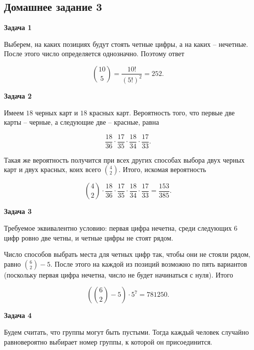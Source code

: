 \subsection{Домашнее задание 3}


	\begin{center}
    \textbf{Задача 1}
\end{center}
		Выберем, на каких позициях будут стоять четные цифры, а на каких -- нечетные. После этого число определяется однозначно. Поэтому ответ

		\begin{equation*}
			\binom{10}{5} = \frac{10!}{(5!)^2} = 252.
		\end{equation*}


	\begin{center}
    \textbf{Задача 2}
\end{center}
		Имеем $18$ черных карт и $18$ красных карт. Вероятность того, что первые две карты -- черные, а следующие две -- красные, равна

		\begin{equation*}
			\frac{18}{36} \cdot \frac{17}{35} \cdot \frac{18}{34} \cdot \frac{17}{33}.
		\end{equation*}

		Такая же вероятность получится при всех других способах выбора двух черных карт и двух красных, коих всего $\binom{4}{2}$. Итого, искомая вероятность

		\begin{equation*}
			\binom{4}{2} \cdot \frac{18}{36} \cdot \frac{17}{35} \cdot \frac{18}{34} \cdot \frac{17}{33} = \frac{153}{385}.
		\end{equation*}


	\begin{center}
    \textbf{Задача 3}
\end{center}
		Требуемое эквивалентно условию: первая цифра нечетна, среди следующих 6 цифр ровно две четны, и четные цифры не стоят рядом.

		Число способов выбрать места для четных цифр так, чтобы они не стояли рядом, равно $\binom{6}{2} - 5$. После этого на каждой из позиций возможно по пять вариантов (поскольку первая цифра нечетна, число не будет начинаться с нуля). Итого

		\begin{equation*}
			\left( \binom{6}{2} - 5 \right) \cdot 5^7 = 781250.
		\end{equation*}


	\begin{center}
    \textbf{Задача 4}
\end{center}
		Будем считать, что группы могут быть пустыми. Тогда каждый человек случайно равновероятно выбирает номер группы, к которой он присоединится.

